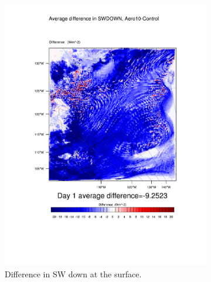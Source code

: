 \begin{figure}
\centering
	\begin{subfigure}{0.48\textwidth}
		\includegraphics[width=\textwidth]{results/aero10/diff_Aero10_SWDOWN_Day1.pdf}
		\caption{Difference in SW down at the surface.}
		\label{subfig:swdown_r3Day1}
	\end{subfigure}
	\quad
	\begin{subfigure}{0.48\textwidth}
		\centering

\end{subfigure}
\end{figure}
